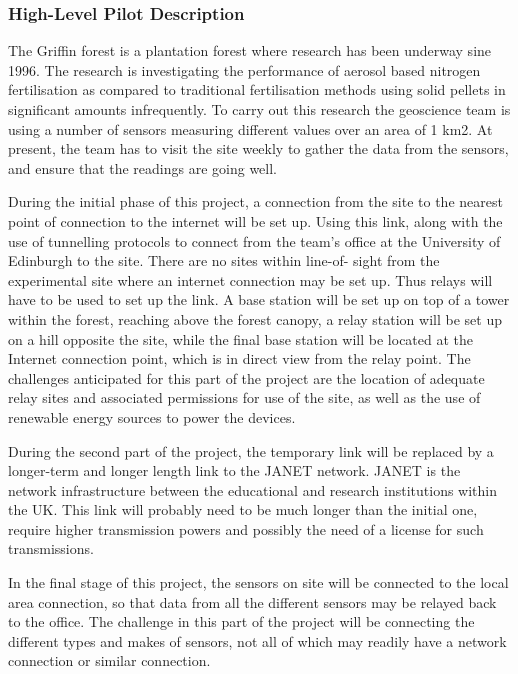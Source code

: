 \documentclass[draftclsnofoot,12pt,journal,onecolumn]{IEEEtran}
\begin{document}
\subsubsection{High-Level Pilot Description}
The Griffin forest is a plantation forest where research has been underway sine 1996. The research
is investigating the performance of aerosol based nitrogen fertilisation as compared to traditional
fertilisation methods using solid pellets in significant amounts infrequently. To carry out this
research the geoscience team is using a number of sensors measuring different values over an area
of 1 km2. At present, the team has to visit the site weekly to gather the data from the sensors, and
ensure that the readings are going well.

During the initial phase of this project, a connection from the site to the nearest point of connection
to the internet will be set up. Using this link, along with the use of tunnelling protocols to connect
from the team's office at the University of Edinburgh to the site. There are no sites within line-of-
sight from the experimental site where an internet connection may be set up. Thus relays will have
to be used to set up the link. A base station will be set up on top of a tower within the forest,
reaching above the forest canopy, a relay station will be set up on a hill opposite the site, while the
final base station will be located at the Internet connection point, which is in direct view from the
relay point. The challenges anticipated for this part of the project are the location of adequate relay
sites and associated permissions for use of the site, as well as the use of renewable energy sources
to power the devices.

During the second part of the project, the temporary link will be replaced by a longer-term and
longer length link to the JANET network. JANET is the network infrastructure between the
educational and research institutions within the UK. This link will probably need to be much longer
than the initial one, require higher transmission powers and possibly the need of a license for such
transmissions.

In the final stage of this project, the sensors on site will be connected to the local area connection,
so that data from all the different sensors may be relayed back to the office. The challenge in this
part of the project will be connecting the different types and makes of sensors, not all of which may
readily have a network connection or similar connection.
\end{document}
